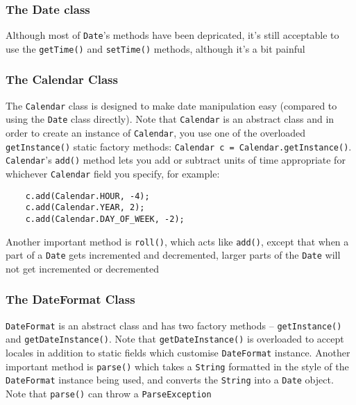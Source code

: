 \subsubsection{The Date class}
Although most of \verb#Date#'s methods have been depricated, it's still 
acceptable to use the \verb#getTime()# and \verb#setTime()# methods, although 
it's a bit painful

\subsubsection{The Calendar Class}
The \verb#Calendar# class is designed to make date manipulation easy (compared to 
using the \verb#Date# class directly). Note that \verb#Calendar# is an abstract 
class and in order to create an instance of \verb#Calendar#, you use one of the 
overloaded \verb#getInstance()# static factory methods:
\verb#Calendar c = Calendar.getInstance()#. \verb#Calendar#'s \verb#add()# 
method lets you add or subtract units of time appropriate for whichever 
\verb#Calendar# field you specify, for example:
\begin{verbatim}
    c.add(Calendar.HOUR, -4);
    c.add(Calendar.YEAR, 2);
    c.add(Calendar.DAY_OF_WEEK, -2);
\end{verbatim}
Another important method is \verb#roll()#, which acts like \verb#add()#, except 
that when a part of a \verb#Date# gets incremented and decremented, larger 
parts of the \verb#Date# will not get incremented or decremented

\subsubsection{The DateFormat Class}
\verb#DateFormat# is an abstract class and has two factory methods -- 
\verb#getInstance()# and \verb#getDateInstance()#. Note that 
\verb#getDateInstance()# is overloaded to accept locales in addition to static 
fields which customise \verb#DateFormat# instance. Another important method is 
\verb#parse()# which takes a \verb#String# formatted in the style of the 
\verb#DateFormat# instance being used, and converts the \verb#String# into a 
\verb#Date# object. Note that \verb#parse()# can throw a \verb#ParseException#

